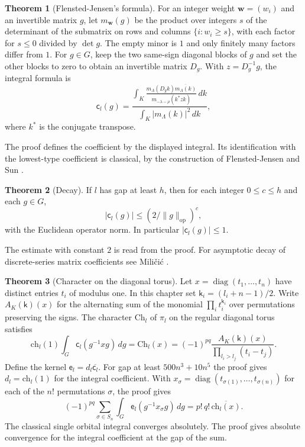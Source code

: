 \documentclass[reqno]{amsart}
\newcounter{chap}
\theoremstyle{definition}
\newtheorem{theorem}{Theorem}
\newcommand{\cc}{\mathsf c}
\newcommand{\ee}{\mathsf e}
\newcommand{\kk}{\mathsf k}
\newcommand{\ch}{\mathrm{ch}}
\newcommand{\Ch}{\mathrm{Ch}}
\newcommand{\diag}{\operatorname{diag}}
\newcommand{\op}{\mathrm{op}}
\begin{document}
\begin{samepage}
\begin{theorem}[Flensted-Jensen's formula]\label{thm:fj}
For an integer weight \(\mathbf w=(w_i)\) and an invertible matrix \(g\), let \(m_{\mathbf w}(g)\) be the product over integers \(s\) of the determinant of the submatrix on rows and columns \(\{i:w_i\ge s\}\), with each factor for \(s\le0\) divided by \(\det g\). The empty minor is \(1\) and only finitely many factors differ from \(1\). For \(g\in G\), keep the two same-sign diagonal blocks of \(g\) and set the other blocks to zero to obtain an invertible matrix \(D_g\). With \(z=D_g^{-1}g\), the integral formula is
\[
 \cc_l(g)=
 \frac{\displaystyle\int_K
   \frac{m_\Lambda(D_g k)\overline{m_\Lambda(k)}}{m_{-\lambda-\rho}(k^*zk)}
   \,dk}
 {\displaystyle\int_K |m_\Lambda(k)|^2\,dk},
\]
where \(k^*\) is the conjugate transpose.
\end{theorem}

\noindent The proof defines the coefficient by the displayed integral. Its identification with the lowest-type coefficient is classical, by the construction of Flensted-Jensen and Sun \cite{FJ,Sun}.
\end{samepage}

\begin{theorem}[Decay]\label{thm:decay}
If \(l\) has gap at least \(h\), then for each integer \(0\le c\le h\) and each \(g\in G\),
\[
 |\cc_l(g)|\le (2/\|g\|_{\op})^c ,
\]
with the Euclidean operator norm. In particular \(|\cc_l(g)|\le 1\).
\end{theorem}

\noindent The estimate with constant \(2\) is read from the proof. For asymptotic decay of discrete-series matrix coefficients see Mili\v{c}i\'c \cite{Mil}.

\begin{theorem}[Character on the diagonal torus]\label{thm:character}
Let \(x=\diag(t_1,\ldots,t_n)\) have distinct entries \(t_i\) of modulus one. In this chapter set \(\kk_i=(l_i+n-1)/2\). Write \(A_K(\kk)(x)\) for the alternating sum of the monomial \(\prod_i t_i^{\kk_i}\) over permutations preserving the signs. The character \(\Ch_l\) of \(\pi_l\) on the regular diagonal torus satisfies
\[
 \ch_l(1)\int_G\cc_l(g^{-1}xg)\,dg
   = \Ch_l(x)
   = (-1)^{pq}\frac{A_K(\kk)(x)}{\prod_{l_i>l_j}(t_i-t_j)} .
\]
Define the kernel \(\ee_l=d_l\overline{\cc_l}\). For gap at least \(500n^3+10n^5\) the proof gives \(d_l=\ch_l(1)\) for the integral coefficient. With \(x_\sigma=\diag(t_{\sigma(1)},\dots,t_{\sigma(n)})\) for each of the \(n!\) permutations \(\sigma\), the proof gives
\[
 (-1)^{pq}\sum_{\sigma\in S_n}\int_G
  \ee_l(g^{-1}x_\sigma g)\,dg
   =p!\,q!\,\overline{\ch_l(x)}.
\]
The classical single orbital integral converges absolutely. The proof gives absolute convergence for the integral coefficient at the gap of the sum.
\end{theorem}
\end{document}
